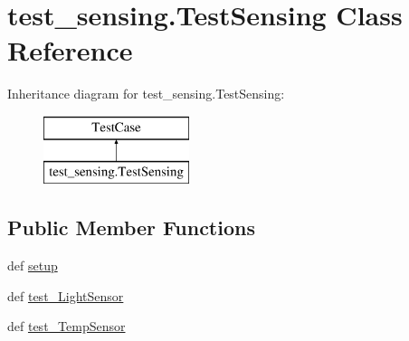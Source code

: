 \hypertarget{classtest__sensing_1_1_test_sensing}{\section{test\-\_\-sensing.\-Test\-Sensing Class Reference}
\label{classtest__sensing_1_1_test_sensing}
}
Inheritance diagram for test\-\_\-sensing.\-Test\-Sensing\-:\begin{figure}[H]
\begin{center}
\leavevmode
\includegraphics[height=2.000000cm]{classtest__sensing_1_1_test_sensing}
\end{center}
\end{figure}
\subsection*{Public Member Functions}
\begin{DoxyCompactItemize}
\item 
def \hyperlink{classtest__sensing_1_1_test_sensing_a8108831848700c03f289e756d849268b}{setup}
\item 
def \hyperlink{classtest__sensing_1_1_test_sensing_a0d1b334a31f4dea05ffd10d032069bd6}{test\-\_\-\-Light\-Sensor}
\item 
def \hyperlink{classtest__sensing_1_1_test_sensing_ac31ab35d2d8ef9a50d0e87f340334450}{test\-\_\-\-Temp\-Sensor}
\end{DoxyCompactItemize}


